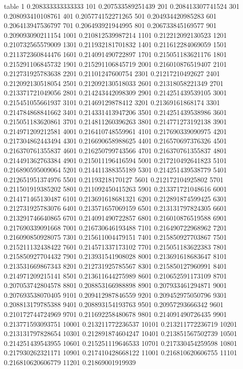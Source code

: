 table {%
1 0.208333333333333
101 0.207533589251439
201 0.208413307741524
301 0.208093410108761
401 0.205774152271265
501 0.204934420985283
601 0.206413947536797
701 0.206493921944995
801 0.206733845169577
901 0.209093090211154
1001 0.210812539987214
1101 0.212212092130523
1201 0.210732565579009
1301 0.211932181701832
1401 0.211612284069059
1501 0.211372360844476
1601 0.214091490722897
1701 0.215051183621176
1801 0.215291106845732
1901 0.215291106845719
2001 0.216010876519407
2101 0.212731925783638
2201 0.21101247600754
2301 0.21217210492627
2401 0.212092130518054
2501 0.212092130518033
2601 0.21318058221349
2701 0.213371721049056
2801 0.214243442098309
2901 0.214251439539105
3001 0.215451055661937
3101 0.21469129878412
3201 0.21369161868174
3301 0.214784868841662
3401 0.214331413947206
3501 0.214251439538986
3601 0.215051183620861
3701 0.214811260396263
3801 0.214771273192138
3901 0.214971209212581
4001 0.216410748559961
4101 0.217690339090975
4201 0.217304862443494
4301 0.216690658988625
4401 0.216570697376326
4501 0.216370761355837
4601 0.216250799743566
4701 0.216370761355837
4801 0.214491362763384
4901 0.215011196416594
5001 0.217210492641823
5101 0.216890595009064
5201 0.214411388355189
5301 0.214251439538779
5401 0.212651951374976
5501 0.21193218170127
5601 0.212172104925802
5701 0.211501919385202
5801 0.211092450415263
5901 0.213371721048616
6001 0.214171465130487
6101 0.213691618681321
6201 0.212891874599425
6301 0.212731925783076
6401 0.213571657069159
6501 0.213131797824305
6601 0.213291746640865
6701 0.214091490722857
6801 0.216010876519588
6901 0.217690339091668
7001 0.216730646193488
7101 0.216490722968962
7201 0.216090850928075
7301 0.215611004479151
7401 0.215850927703867
7501 0.215211132438422
7601 0.214571337173102
7701 0.215051183622383
7801 0.215850927704432
7901 0.213931541908028
8001 0.213691618683647
8101 0.213531669867343
8201 0.212731925785567
8301 0.215850127960991
8401 0.214971209215141
8501 0.213611644275989
8601 0.210652591173109
8701 0.207053742804578
8801 0.208853166988898
8901 0.207933461294871
9001 0.207693538070405
9101 0.209412987846559
9201 0.209452975050796
9301 0.208813179785388
9401 0.208893154193763
9501 0.20957293666342
9601 0.210172744724969
9701 0.211692258480678
9801 0.214091490726435
9901 0.213771593093751
10001 0.213211772236537
10101 0.213211772236719
10201 0.213131797828654
10301 0.212891874604247
10401 0.213851567502739
10501 0.214251439543955
10601 0.215251119646533
10701 0.217330454259598
10801 0.217930262321171
10901 0.217410428668122
11001 0.216810620606755
11101 0.216810620606779
11201 0.21869001919939
}
